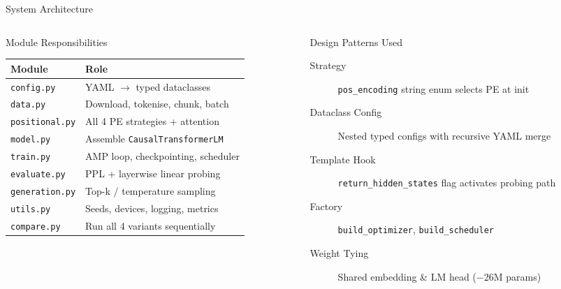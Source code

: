 \documentclass[aspectratio=169, 10pt]{beamer}
\begin{document}
\begin{frame}{System Architecture}
  \begin{columns}[T]
    \begin{column}{0.5\textwidth}
      \begin{block}{Module Responsibilities}
        \begin{tabular}{>{\scriptsize}lp{5.1cm}}
          \toprule
          \normalfont\textbf{Module} & \textbf{Role} \\
          \midrule
          \texttt{config.py}    & YAML $\to$ typed dataclasses \\
          \texttt{data.py}      & Download, tokenise, chunk, batch \\
          \texttt{positional.py} & All 4 PE strategies + attention \\
          \texttt{model.py}     & Assemble \texttt{CausalTransformerLM} \\
          \texttt{train.py}     & AMP loop, checkpointing, scheduler \\
          \texttt{evaluate.py}  & PPL + layerwise linear probing \\
          \texttt{generation.py} & Top-k / temperature sampling \\
          \texttt{utils.py}     & Seeds, devices, logging, metrics \\
          \texttt{compare.py}   & Run all 4 variants sequentially \\
          \bottomrule
        \end{tabular}
      \end{block}
    \end{column}
    \begin{column}{0.48\textwidth}
      \begin{block}{Design Patterns Used}
        \begin{description}
          \item[\alert{Strategy}] \texttt{pos\_encoding} string enum selects PE at init
          \item[\alert{Dataclass Config}] Nested typed configs with recursive YAML merge
          \item[\alert{Template Hook}] \texttt{return\_hidden\_states} flag activates probing path
          \item[\alert{Factory}] \texttt{build\_optimizer}, \texttt{build\_scheduler}
          \item[\alert{Weight Tying}] Shared embedding \& LM head ($-$26M params)
        \end{description}

\end{block}
\end{column}
\end{columns}
\end{frame}
\end{document}
